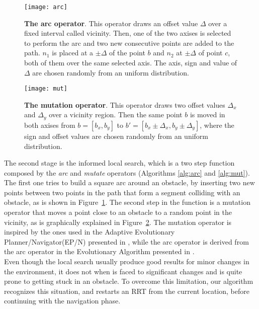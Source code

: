 \documentclass[10pt, conference, compsoc]{IEEEtran}
\begin{document}
\begin{figure}[ht]
\begin{center}
\texttt{[image: arc]}
\caption[\textbf{The arc operator}]{\textbf{The arc operator}. This operator draws an offset value $\Delta$ over a fixed interval called vicinity. 
Then, one of the two axises is selected to perform the arc and two new consecutive points are added to the path. 
$n_1$ is placed at a $\pm \Delta$ of the point $b$ and $n_2$ at $\pm \Delta$ of point $c$, both of them over the same selected axis. 
The axis, sign and value of $\Delta$ are chosen randomly from an uniform distribution.}
\label{fig:arc}
\end{center}
\end{figure}

\begin{figure}[ht]
\begin{center}
\texttt{[image: mut]}
\caption[\textbf{The mutation operator}]{\textbf{The mutation operator}. This operator draws two offset values $\Delta_x$ and $\Delta_y$ over a vicinity
region. Then the same point $b$ is moved in both axises from $b=[b_x,b_y]$ to $b'=[b_x \pm \Delta_x, b_y\pm \Delta_y]$, where the sign and offset values
are chosen randomly from an uniform distribution.}
\label{fig:mut}
\end{center}
\end{figure}

The second stage is the informed local search,
which is a two step function composed by the \emph{arc} and \emph{mutate} operators
(Algorithms \ref{alg:arc} and \ref{alg:mut}).
The first one tries to build a square arc around an
obstacle, by inserting two new points between two points in the path that form a
segment colliding with an obstacle, as is shown in Figure~\ref{fig:arc}. 
The second step in the function is a mutation
operator that moves a point close to an obstacle to a
random point in the vicinity, as is graphically explained in Figure~\ref{fig:mut}.
The mutation operator is inspired by the ones used in the Adaptive Evolutionary
Planner/Navigator(EP/N) presented in \cite{Xiao97}, while the arc operator is
derived from the arc operator in the Evolutionary Algorithm presented in
\cite{Alfaro05}.\\
Even though the local search usually produce good results for minor changes in the environment,
it does not when is faced to significant changes and is quite prone to getting stuck
in an obstacle. To overcome this limitation, our algorithm recognizes this situation, and restarts
an RRT from the current location, before continuing with the navigation phase.
\end{document}
